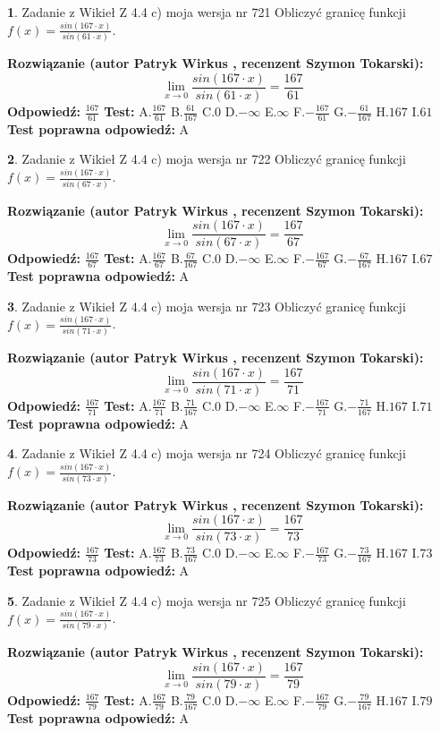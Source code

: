 \documentclass[12pt, a4paper]{article}
\theoremstyle{definition} %
\newtheorem{zad}{}
\newcommand{\zadStart}[1]{\begin{zad}#1\newline}
\newcommand{\zadStop}{\end{zad}}
\newcommand{\rozwStart}[2]{\noindent \textbf{Rozwiązanie (autor #1 , recenzent #2): }\newline}
\newcommand{\rozwStop}{\newline}
\newcommand{\odpStart}{\noindent \textbf{Odpowiedź:}\newline}
\newcommand{\odpStop}{\newline}
\newcommand{\testStart}{\noindent \textbf{Test:}\newline}
\newcommand{\testStop}{\newline}
\newcommand{\kluczStart}{\noindent \textbf{Test poprawna odpowiedź:}\newline}
\newcommand{\kluczStop}{\newline}
\begin{document}
\zadStart{Zadanie z Wikieł Z 4.4 c) moja wersja nr 721}
Obliczyć granicę funkcji $f(x)=\frac{sin(167\cdot x)}{sin(61\cdot x)}$.
\zadStop
\rozwStart{Patryk Wirkus}{Szymon Tokarski}
$$\lim\limits_{x\to 0}\frac{sin(167\cdot x)}{sin(61\cdot x)}=
\frac{167}{61}$$
\rozwStop
\odpStart
$\frac{167}{61}$
\odpStop
\testStart
A.$\frac{167}{61}$
B.$\frac{61}{167}$
C.$0$
D.$-\infty$
E.$\infty$
F.$-\frac{167}{61}$
G.$-\frac{61}{167}$
H.$167$
I.$61$
\testStop
\kluczStart
A
\kluczStop



\zadStart{Zadanie z Wikieł Z 4.4 c) moja wersja nr 722}
Obliczyć granicę funkcji $f(x)=\frac{sin(167\cdot x)}{sin(67\cdot x)}$.
\zadStop
\rozwStart{Patryk Wirkus}{Szymon Tokarski}
$$\lim\limits_{x\to 0}\frac{sin(167\cdot x)}{sin(67\cdot x)}=
\frac{167}{67}$$
\rozwStop
\odpStart
$\frac{167}{67}$
\odpStop
\testStart
A.$\frac{167}{67}$
B.$\frac{67}{167}$
C.$0$
D.$-\infty$
E.$\infty$
F.$-\frac{167}{67}$
G.$-\frac{67}{167}$
H.$167$
I.$67$
\testStop
\kluczStart
A
\kluczStop



\zadStart{Zadanie z Wikieł Z 4.4 c) moja wersja nr 723}
Obliczyć granicę funkcji $f(x)=\frac{sin(167\cdot x)}{sin(71\cdot x)}$.
\zadStop
\rozwStart{Patryk Wirkus}{Szymon Tokarski}
$$\lim\limits_{x\to 0}\frac{sin(167\cdot x)}{sin(71\cdot x)}=
\frac{167}{71}$$
\rozwStop
\odpStart
$\frac{167}{71}$
\odpStop
\testStart
A.$\frac{167}{71}$
B.$\frac{71}{167}$
C.$0$
D.$-\infty$
E.$\infty$
F.$-\frac{167}{71}$
G.$-\frac{71}{167}$
H.$167$
I.$71$
\testStop
\kluczStart
A
\kluczStop



\zadStart{Zadanie z Wikieł Z 4.4 c) moja wersja nr 724}
Obliczyć granicę funkcji $f(x)=\frac{sin(167\cdot x)}{sin(73\cdot x)}$.
\zadStop
\rozwStart{Patryk Wirkus}{Szymon Tokarski}
$$\lim\limits_{x\to 0}\frac{sin(167\cdot x)}{sin(73\cdot x)}=
\frac{167}{73}$$
\rozwStop
\odpStart
$\frac{167}{73}$
\odpStop
\testStart
A.$\frac{167}{73}$
B.$\frac{73}{167}$
C.$0$
D.$-\infty$
E.$\infty$
F.$-\frac{167}{73}$
G.$-\frac{73}{167}$
H.$167$
I.$73$
\testStop
\kluczStart
A
\kluczStop



\zadStart{Zadanie z Wikieł Z 4.4 c) moja wersja nr 725}
Obliczyć granicę funkcji $f(x)=\frac{sin(167\cdot x)}{sin(79\cdot x)}$.
\zadStop
\rozwStart{Patryk Wirkus}{Szymon Tokarski}
$$\lim\limits_{x\to 0}\frac{sin(167\cdot x)}{sin(79\cdot x)}=
\frac{167}{79}$$
\rozwStop
\odpStart
$\frac{167}{79}$
\odpStop
\testStart
A.$\frac{167}{79}$
B.$\frac{79}{167}$
C.$0$
D.$-\infty$
E.$\infty$
F.$-\frac{167}{79}$
G.$-\frac{79}{167}$
H.$167$
I.$79$
\testStop
\kluczStart
A
\kluczStop
\end{document}
